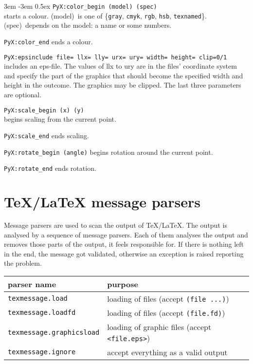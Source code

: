 \begingroup
\leftskip3em
\parindent-3em
\parskip0.5ex
\texttt{PyX:color\_begin (model) (spec)}\\
  starts a colour. (model)~is one of
  \{\verb|gray|, \verb|cmyk|, \verb|rgb|, \verb|hsb|, \verb|texnamed|\}.
  (spec)~depends on the model: a name or some numbers.\par
\texttt{PyX:color\_end} ends a colour.\par
\texttt{PyX:epsinclude file= llx= lly= urx= ury= width= height= clip=0/1}\\
  includes an eps-file. The values of llx to ury are in the files' coordinate
  system and specify the part of the graphics that should become the specified
  width and height in the outcome. The graphics may be clipped. The last three
  parameters are optional.\par
\texttt{PyX:scale\_begin (x) (y)}\\
  begins scaling from the current point.\par
\texttt{PyX:scale\_end} ends scaling.\par
\texttt{PyX:rotate\_begin (angle)} begins rotation around the current
  point.\par
\texttt{PyX:rotate\_end} ends rotation.\par
\endgroup


\section{\TeX/\LaTeX{} message parsers}

Message parsers are used to scan the output of \TeX/\LaTeX. The output
is analysed by a sequence of message parsers. Each of them analyses
the output and removes those parts of the output, it feels responsible
for. If there is nothing left in the end, the message got validated,
otherwise an exception is raised reporting the problem.

\medskip
\begin{tabular}{ll}
parser name&purpose\\
\hline
\texttt{texmessage.load}&loading of files (accept \texttt{(file ...)})\\
\texttt{texmessage.loadfd}&loading of files (accept \texttt{(file.fd)})\\
\texttt{texmessage.graphicsload}&loading of graphic files (accept \texttt{<file.eps>})\\
\texttt{texmessage.ignore}&accept everything as a valid output\\
\end{tabular}
\medskip

